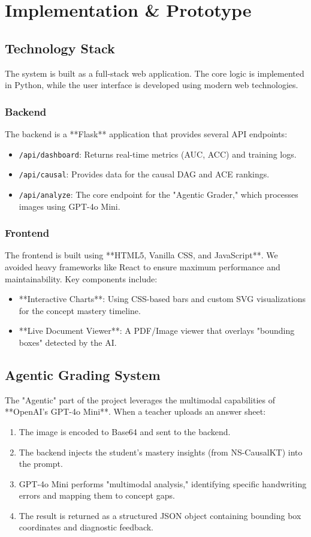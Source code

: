 \chapter{Implementation \& Prototype}

\section{Technology Stack}
The system is built as a full-stack web application. The core logic is implemented in Python, while the user interface is developed using modern web technologies.

\subsection{Backend}
The backend is a **Flask** application that provides several API endpoints:
\begin{itemize}
    \item \texttt{/api/dashboard}: Returns real-time metrics (AUC, ACC) and training logs.
    \item \texttt{/api/causal}: Provides data for the causal DAG and ACE rankings.
    \item \texttt{/api/analyze}: The core endpoint for the "Agentic Grader," which processes images using GPT-4o Mini.
\end{itemize}

\subsection{Frontend}
The frontend is built using **HTML5, Vanilla CSS, and JavaScript**. We avoided heavy frameworks like React to ensure maximum performance and maintainability. Key components include:
\begin{itemize}
    \item **Interactive Charts**: Using CSS-based bars and custom SVG visualizations for the concept mastery timeline.
    \item **Live Document Viewer**: A PDF/Image viewer that overlays "bounding boxes" detected by the AI.
\end{itemize}

\section{Agentic Grading System}
The "Agentic" part of the project leverages the multimodal capabilities of **OpenAI's GPT-4o Mini**. When a teacher uploads an answer sheet:
\begin{enumerate}
    \item The image is encoded to Base64 and sent to the backend.
    \item The backend injects the student's mastery insights (from NS-CausalKT) into the prompt.
    \item GPT-4o Mini performs "multimodal analysis," identifying specific handwriting errors and mapping them to concept gaps.
    \item The result is returned as a structured JSON object containing bounding box coordinates and diagnostic feedback.
\end{enumerate}

